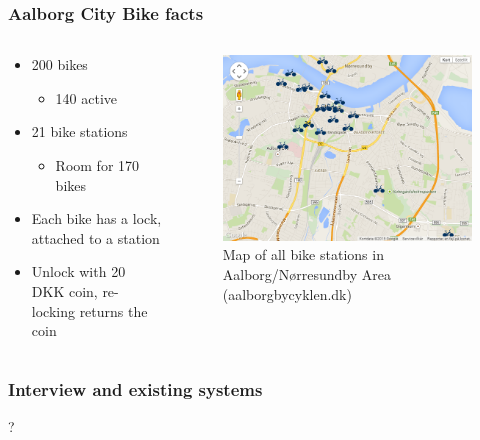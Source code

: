 \begin{frame}
\frametitle{Aalborg City Bike facts}
\begin{columns}
\begin{column}{.44\textwidth}
\begin{itemize}
\item 200 bikes
\begin{itemize}
\item 140 active
\end{itemize}
\item 21 bike stations
\begin{itemize}
\item Room for 170 bikes
\end{itemize}
\item Each bike has a lock, attached to a station
\item Unlock with 20 DKK coin, re-locking returns the coin
\end{itemize}
\end{column}
\begin{column}{.44\textwidth}
\begin{figure}
\includegraphics[width=\textwidth]{graphics/acb_gmaps}
\caption{Map of all bike stations in Aalborg/Nørresundby Area (aalborgbycyklen.dk)}
\end{figure}
\end{column}
\end{columns}
\end{frame}

\begin{frame}
\frametitle{Interview and existing systems}
{\Huge ?}
\end{frame}

